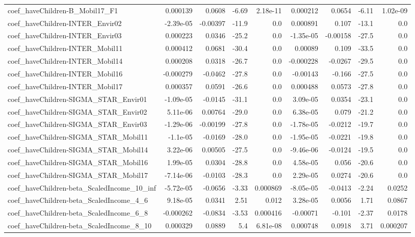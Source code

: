 \begin{tabular}{lrrrrrrrr}
coef_haveChildren-B_Mobil17_F1 & 0.000139 & 0.0608 & -6.69 & 2.18e-11 & 0.000212 & 0.0654 & -6.11 & 1.02e-09 \\
coef_haveChildren-INTER_Envir02 & -2.39e-05 & -0.00397 & -11.9 & 0.0 & 0.000891 & 0.107 & -13.1 & 0.0 \\
coef_haveChildren-INTER_Envir03 & 0.000223 & 0.0346 & -25.2 & 0.0 & -1.35e-05 & -0.00158 & -27.5 & 0.0 \\
coef_haveChildren-INTER_Mobil11 & 0.000412 & 0.0681 & -30.4 & 0.0 & 0.00089 & 0.109 & -33.5 & 0.0 \\
coef_haveChildren-INTER_Mobil14 & 0.000208 & 0.0318 & -26.7 & 0.0 & -0.000228 & -0.0267 & -29.5 & 0.0 \\
coef_haveChildren-INTER_Mobil16 & -0.000279 & -0.0462 & -27.8 & 0.0 & -0.00143 & -0.166 & -27.5 & 0.0 \\
coef_haveChildren-INTER_Mobil17 & 0.000357 & 0.0591 & -26.6 & 0.0 & 0.000488 & 0.0573 & -27.8 & 0.0 \\
coef_haveChildren-SIGMA_STAR_Envir01 & -1.09e-05 & -0.0145 & -31.1 & 0.0 & 3.09e-05 & 0.0354 & -23.1 & 0.0 \\
coef_haveChildren-SIGMA_STAR_Envir02 & 5.11e-06 & 0.00764 & -29.0 & 0.0 & 6.38e-05 & 0.079 & -21.2 & 0.0 \\
coef_haveChildren-SIGMA_STAR_Envir03 & -1.29e-06 & -0.00199 & -27.8 & 0.0 & -1.78e-05 & -0.0212 & -19.7 & 0.0 \\
coef_haveChildren-SIGMA_STAR_Mobil11 & -1.1e-05 & -0.0169 & -28.0 & 0.0 & -1.95e-05 & -0.0221 & -19.8 & 0.0 \\
coef_haveChildren-SIGMA_STAR_Mobil14 & 3.22e-06 & 0.00505 & -27.5 & 0.0 & -9.46e-06 & -0.0124 & -19.5 & 0.0 \\
coef_haveChildren-SIGMA_STAR_Mobil16 & 1.99e-05 & 0.0304 & -28.8 & 0.0 & 4.58e-05 & 0.056 & -20.6 & 0.0 \\
coef_haveChildren-SIGMA_STAR_Mobil17 & -7.14e-06 & -0.0103 & -28.3 & 0.0 & 2.29e-05 & 0.0274 & -20.6 & 0.0 \\
coef_haveChildren-beta_ScaledIncome_10_inf & -5.72e-05 & -0.0656 & -3.33 & 0.000869 & -8.05e-05 & -0.0413 & -2.24 & 0.0252 \\
coef_haveChildren-beta_ScaledIncome_4_6 & 9.18e-05 & 0.0341 & 2.51 & 0.012 & 3.28e-05 & 0.0056 & 1.71 & 0.0867 \\
coef_haveChildren-beta_ScaledIncome_6_8 & -0.000262 & -0.0834 & -3.53 & 0.000416 & -0.00071 & -0.101 & -2.37 & 0.0178 \\
coef_haveChildren-beta_ScaledIncome_8_10 & 0.000329 & 0.0889 & 5.4 & 6.81e-08 & 0.000748 & 0.0918 & 3.71 & 0.000207 \\

\end{tabular}
